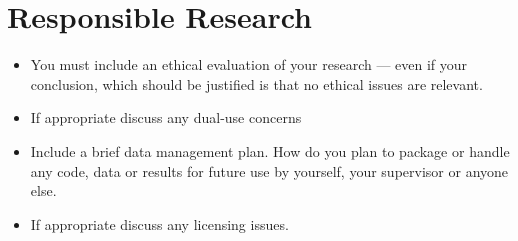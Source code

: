 \documentclass[11pt]{ipp}
\begin{document}
\section{Responsible Research}
\begin{itemize}[nosep]
    \item You must include an ethical evaluation of your research --- even if your conclusion, which should be justified is that no ethical issues are relevant.
    \item If appropriate discuss any dual-use concerns
    \item Include a brief data management plan. How do you plan to package or handle any code, data or results for future use by yourself, your supervisor or anyone else.
    \item If appropriate discuss any licensing issues.
\end{itemize}

\printbibliography[heading=bibnumbered,title=\refname,label={bibliography}]

\appendix
\end{document}
